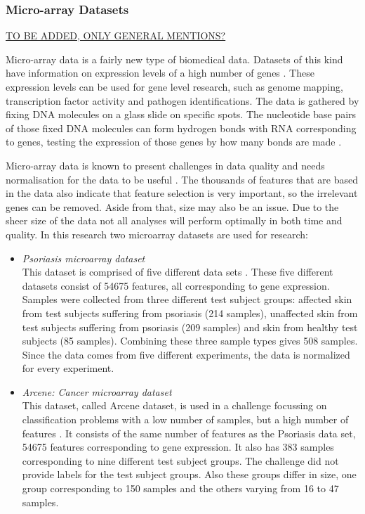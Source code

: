 \documentclass[10pt,a4paper]{report}
\begin{document}
	\subsubsection{Micro-array Datasets} \underline{TO BE ADDED, ONLY GENERAL MENTIONS?}
	\label{PLsubsec:Microarray}
	
	Micro-array data is a fairly new type of biomedical data. Datasets of this kind have information on expression levels of a high number of genes \cite{brazma2001minimum}. These expression levels can be used for gene level research, such as genome mapping, transcription factor activity and pathogen identifications. The data is gathered by fixing DNA molecules on a glass slide on specific spots. The nucleotide base pairs of those fixed DNA molecules can form hydrogen bonds with RNA corresponding to genes, testing the expression of those genes by how many bonds are made \cite{selvaraj2011microarray}.
	
	Micro-array data is known to present challenges in data quality and needs normalisation for the data to be useful \cite{selvaraj2011microarray}. The thousands of features that are based in the data also indicate that feature selection is very important, so the irrelevant genes can be removed. Aside from that, size may also be an issue. Due to the sheer size of the data not all analyses will perform optimally in both time and quality. In this research two microarray datasets are used for research:
	
	\begin{itemize}
		\item \textit{Psoriasis microarray dataset} \\ This dataset is comprised of five different data sets \cite{nair2009genome, suarez2012expanding, bigler2013cross, yao2008type}. These five different datasets consist of 54675 features, all corresponding to gene expression. Samples were collected from three different test subject groups: affected skin from test subjects suffering from psoriasis (214 samples), unaffected skin from test subjects suffering from psoriasis (209 samples) and skin from healthy test subjects (85 samples). Combining these three sample types gives 508 samples. Since the data comes from five different experiments, the data is normalized for every experiment.
		\item \textit{Arcene: Cancer microarray dataset} \\ This dataset, called Arcene dataset, is used in a challenge focussing on classification problems with a low number of samples, but a high number of features \cite{wojnarski2010rsctc}. It consists of the same number of features as the Psoriasis data set, 54675 features corresponding to gene expression. It also has 383 samples corresponding to nine different test subject groups. The challenge did not provide labels for the test subject groups. Also these groups differ in size, one group corresponding to 150 samples and the others varying from 16 to 47 samples.
	\end{itemize}
	
\end{document}
